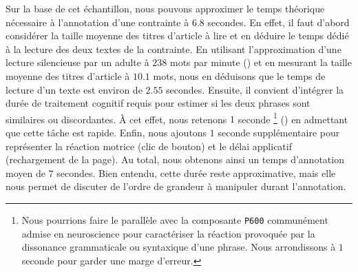 			Sur la base de cet échantillon, nous pouvons approximer le temps théorique nécessaire à l'annotation d'une contrainte à $6.8$ secondes.
			En effet, il faut d'abord considérer la taille moyenne des titres d'article à lire et en déduire le temps dédié à la lecture des deux textes de la contrainte.
			En utilisant l'approximation d'une lecture silencieuse par un adulte à $238$ mots par minute (\cite{brysbaert:2019:how-many-words}) et en mesurant la taille moyenne des titres d'article à $10.1$ mots, nous en déduisons que le temps de lecture d'un texte est environ de $2.55$ secondes.
			Ensuite, il convient d'intégrer la durée de traitement cognitif requis pour estimer si les deux phrases sont similaires ou discordantes.
			À cet effet, nous retenons $1$ seconde \footnote{
				Nous pourrions faire le parallèle avec la composante \texttt{P600} communément admise en neuroscience pour caractériser la réaction provoquée par la dissonance grammaticale ou syntaxique d'une phrase.
				Nous arrondissons à $1$ seconde pour garder une marge d'erreur.
			} (\cite{purves-brannon:2013:principles-cognitive-neuroscience})
			en admettant que cette tâche est rapide.
			Enfin, nous ajoutons $1$ seconde supplémentaire pour représenter la réaction motrice (clic de bouton) et le délai applicatif (rechargement de la page).
			Au total, nous obtenons ainsi un temps d'annotation moyen de $7$ secondes.
			Bien entendu, cette durée reste approximative, mais elle nous permet de discuter de l'ordre de grandeur à manipuler durant l'annotation.
			
